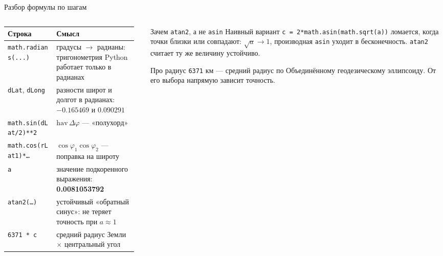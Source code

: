 \documentclass[aspectratio=169,10pt]{beamer}
\newcommand{\num}[1]{\textcolor{codered}{\textbf{#1}}}
\begin{document}
\begin{frame}{Разбор формулы по шагам}
\scriptsize
\begin{columns}[T,onlytextwidth]
  \begin{column}{0.56\textwidth}
    \setlength{\tabcolsep}{3pt}
    \begin{tabular}{@{}p{0.36\linewidth}p{0.60\linewidth}@{}}
      \toprule
      Строка & Смысл \\
      \midrule
      \texttt{math.radians(...)} &
        градусы $\to$ радианы: тригонометрия Python работает только
        в радианах \\
      \texttt{dLat}, \texttt{dLong} &
        разности широт и долгот в радианах: $-0.165469$ и $0.090291$ \\
      \texttt{math.sin(dLat/2)**2} &
        $\mathrm{hav}\,\Delta\varphi$ --- «полухорд» \\
      \texttt{math.cos(rLat1)*\dots} &
        $\cos\varphi_1\cos\varphi_2$ --- поправка на широту \\
      \texttt{a} &
        значение подкоренного выражения: \num{0.0081053792} \\
      \texttt{atan2(\dots)} &
        устойчивый «обратный синус»: не теряет точность при $a\approx1$ \\
      \texttt{6371 * c} &
        средний радиус Земли $\times$ центральный угол \\
      \bottomrule
    \end{tabular}
  \end{column}
  \begin{column}{0.42\textwidth}
    \begin{block}{Зачем \texttt{atan2}, а не \texttt{asin}}\small
      Наивный вариант
      \texttt{c = 2*math.asin(math.sqrt(a))} ломается, когда точки близки
      или совпадают: $\sqrt a\to1$, производная \texttt{asin} уходит
      в бесконечность. \texttt{atan2} считает ту же величину устойчиво.
    \end{block}
    \vspace{0.3em}
    \begin{block}{Про радиус}\small
      \texttt{6371} км --- средний радиус по Объединённому геодезическому
      эллипсоиду. От его выбора напрямую зависит точность.
    \end{block}
  \end{column}
\end{columns}
\end{frame}
\end{document}

